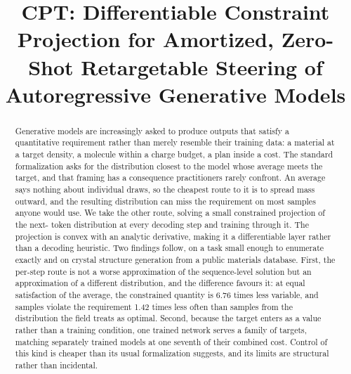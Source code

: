 \documentclass[11pt]{article}
\title{CPT: Differentiable Constraint Projection for Amortized, Zero-Shot
Retargetable Steering of Autoregressive Generative Models}
\begin{document}
\maketitle

\begin{abstract}Generative models are increasingly asked to produce outputs that satisfy a quantitative
requirement rather than merely resemble their training data: a material at a target
density, a molecule within a charge budget, a plan inside a cost. The standard
formalization asks for the distribution closest to the model whose average meets the
target, and that framing has a consequence practitioners rarely confront. An average
says nothing about individual draws, so the cheapest route to it is to spread mass
outward, and the resulting distribution can miss the requirement on most samples anyone
would use. We take the other route, solving a small constrained projection of the next-
token distribution at every decoding step and training through it. The projection is
convex with an analytic derivative, making it a differentiable layer rather than a
decoding heuristic. Two findings follow, on a task small enough to enumerate exactly and
on crystal structure generation from a public materials database. First, the per-step
route is not a worse approximation of the sequence-level solution but an approximation
of a different distribution, and the difference favours it: at equal satisfaction of the
average, the constrained quantity is 6.76 times less variable, and samples violate the
requirement 1.42 times less often than samples from the distribution the field treats as
optimal. Second, because the target enters as a value rather than a training condition,
one trained network serves a family of targets, matching separately trained models at
one seventh of their combined cost. Control of this kind is cheaper than its usual
formalization suggests, and its limits are structural rather than incidental.\end{abstract}

\printkeywords








\end{document}
